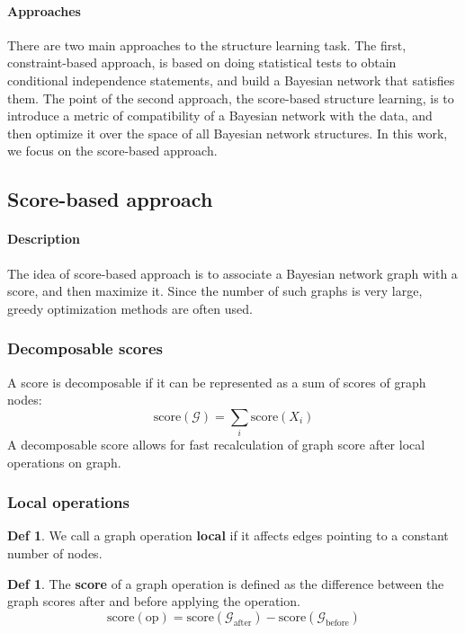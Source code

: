 \documentclass{article}
\newcommand{\score}[1]{\textrm{score}(#1)}
\newcommand{\graph}[1]{\mathcal{#1}}
\begin{document}
\paragraph{Approaches} There are two main approaches to the structure learning task. The first, constraint-based approach, is based on doing statistical tests to obtain conditional independence statements, and build a Bayesian network that satisfies them. The point of the second approach, the score-based structure learning, is to introduce a metric of compatibility of a Bayesian network with the data, and then optimize it over the space of all Bayesian network structures. In this work, we focus on the score-based approach.

\subsection{Score-based approach}
\paragraph{Description} The idea of score-based approach is to associate a Bayesian network graph with a score, and then maximize it. Since the number of such graphs is very large, greedy optimization methods are often used.
\subsubsection{Decomposable scores}
A score is decomposable if it can be represented as a sum of scores of graph nodes: 
\begin{equation}
\label{eq:decomposable_score}
\score{\graph{G}} = \sum_i{\score{X_i}}
\end{equation} 
A decomposable score allows for fast recalculation of graph score after local operations on graph. 
\subsubsection{Local operations}

\theoremstyle{definition}
\newtheorem*{local.operation}{Def}
\begin{local.operation}
	We call a graph operation \textbf{local} if it affects edges pointing to a constant number of nodes.
\end{local.operation}

\theoremstyle{definition}
\newtheorem*{operation.score}{Def}
\begin{operation.score}
	The \textbf{score} of a graph operation is defined as the difference between the graph scores after and before applying the operation.
	$$ \score{\textrm{op}} = \score{\graph{G}_{\textrm{after}}} - \score{\graph{G}_{\textrm{before}}} $$
\end{operation.score}
\end{document}
